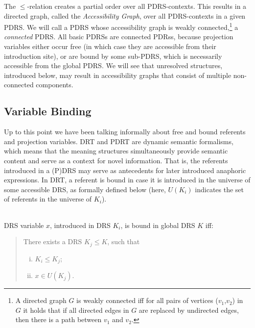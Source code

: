 
The $\leq$-relation creates a partial order over all PDRS-contexts. This
results in a directed graph, called the \textit{Accessibility Graph}, over
all PDRS-contexts in a given PDRS. We will call a PDRS whose accessibility
graph is weakly connected,\footnote{A directed graph $G$ is weakly connected
iff for all pairs of vertices ($v_1$,$v_2$) in $G$ it holds that if all
directed edges in $G$ are replaced by undirected edges, then there is a path
between $v_1$ and $v_2$.} a \emph{connected} PDRS. All basic PDRSs are
connected PDRss, because projection variables either occur free (in which
case they are accessible from their introduction site), or are bound by some
sub-PDRS, which is necessarily accessible from the global PDRS. We will see
that unresolved structures, introduced below, may result in accessibility
graphs that consist of multiple non-connected components.


\subsection{Variable Binding}

Up to this point we have been talking informally about free and bound
referents and projection variables. DRT and PDRT are dynamic semantic
formalisms, which means that the meaning structures simultaneously provide
semantic content and serve as a context for novel information. That is, the
referents introduced in a (P)DRS may serve as antecedents for later
introduced anaphoric expressions. In DRT, a referent is bound in case it is
introduced in the universe of some accessible DRS, as formally defined below
(here, $U(K_i)$ indicates the set of referents in the universe of $K_i$).

\begin{definition}~\\
DRS variable $x$, introduced in DRS $K_i$, is bound in global DRS $K$ iff:
\begin{quote}
There exists a DRS $K_j \leq K$, such that
\begin{enumerate}[i.]
  \item $K_i \leq K_j$;
  \item $x\in U(K_j)$. %
\end{enumerate}
\end{quote}
\end{definition}


